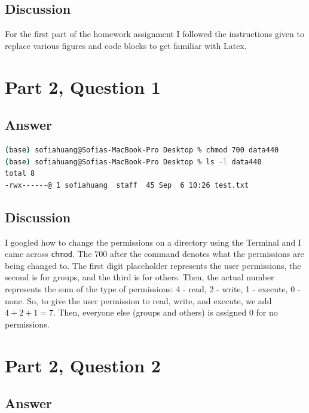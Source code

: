 \documentclass[12pt]{article}
\begin{document}
\subsection*{Discussion}

For the first part of the homework assignment I followed the instructions given to replace various figures and code blocks to get familiar with Latex. 

\section*{Part 2, Question 1}

\subsection*{Answer}

\begin{lstlisting}[language=bash, caption=Permissions on directory, label=lst:copy]
(base) sofiahuang@Sofias-MacBook-Pro Desktop % chmod 700 data440 
(base) sofiahuang@Sofias-MacBook-Pro Desktop % ls -l data440
total 8
-rwx------@ 1 sofiahuang  staff  45 Sep  6 10:26 test.txt
\end{lstlisting}

\subsection*{Discussion}

I googled how to change the permissions on a directory using the Terminal and I came across \lstinline{chmod}. The $700$ after the command denotes what the permissions are being changed to. The first digit placeholder represents the user permissions, the second is for groups, and the third is for others. Then, the actual number represents the sum of the type of permissions: 4 - read, 2 - write, 1 - execute, 0 - none. So, to give the user permission to read, write, and execute, we add $4 + 2 + 1 = 7$. Then, everyone else (groups and others) is assigned 0 for no permissions.

\section*{Part 2, Question 2}

\subsection*{Answer}
\end{document}
